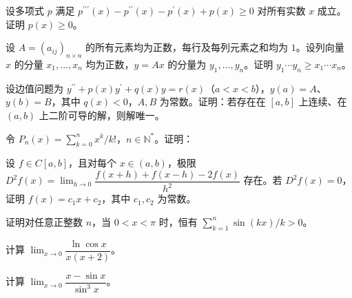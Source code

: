 \noindent\begin{minipage}{\textwidth}
设多项式 $p$ 满足 $p^{\prime\prime\prime}(x)-p^{\prime\prime}(x)-p^{\prime}(x)+p(x)\ge0$ 对所有实数 $x$ 成立。证明 $p(x)\ge0$。
\end{minipage}\par\vfill
\newpage
\noindent\begin{minipage}{\textwidth}
设 $A=(a_{ij})_{n\times n}$ 的所有元素均为正数，每行及每列元素之和均为 $1$。设列向量 $x$ 的分量 $x_1,\ldots,x_n$ 均为正数，$y=Ax$ 的分量为 $y_1,\ldots,y_n$。证明 $y_1\cdots y_n\ge x_1\cdots x_n$。
\end{minipage}\par\vfill
\noindent\begin{minipage}{\textwidth}
设边值问题为 $y^{\prime\prime}+p(x)y^{\prime}+q(x)y=r(x)$（$a<x<b$），$y(a)=A$、$y(b)=B$，其中 $q(x)<0$，$A,B$ 为常数。证明：若存在在 $[a,b]$ 上连续、在 $(a,b)$ 上二阶可导的解，则解唯一。
\end{minipage}\par\vfill
\noindent\begin{minipage}{\textwidth}
令 $P_n(x)=\sum_{k=0}^n x^k/k!$，$n\in\mathbb N^*$。证明：
\end{minipage}\par\vfill
\newpage
\noindent\begin{minipage}{\textwidth}
设 $f\in C[a,b]$，且对每个 $x\in(a,b)$，极限 $D^2f(x)=\lim_{h\to0}\dfrac{f(x+h)+f(x-h)-2f(x)}{h^2}$ 存在。若 $D^2f(x)=0$，证明 $f(x)=c_1x+c_2$，其中 $c_1,c_2$ 为常数。
\end{minipage}\par\vfill
\noindent\begin{minipage}{\textwidth}
证明对任意正整数 $n$，当 $0<x<\pi$ 时，恒有 $\sum_{k=1}^n\sin(kx)/k>0$。
\end{minipage}\par\vfill
\noindent\begin{minipage}{\textwidth}
计算 $\lim_{x\to0}\dfrac{\ln\cos x}{x(x+2)}$。
\end{minipage}\par\vfill
\newpage
\noindent\begin{minipage}{\textwidth}
计算 $\lim_{x\to0}\dfrac{x-\sin x}{\sin^3x}$。
\end{minipage}\par\vfill
